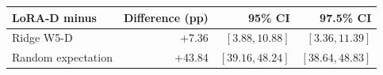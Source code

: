 {\small\setlength{\tabcolsep}{4pt}
\begin{tabularx}{\textwidth}{Xrrr}
\toprule
LoRA-D minus & Difference (pp) & 95\% CI & 97.5\% CI \\
\midrule
Ridge W5-D & +7.36 & $[3.88, 10.88]$ & $[3.36, 11.39]$ \\
Random expectation & +43.84 & $[39.16, 48.24]$ & $[38.64, 48.83]$ \\
\bottomrule
\end{tabularx}}
